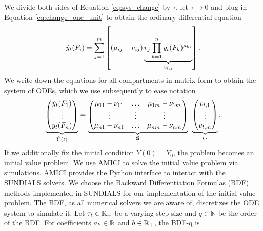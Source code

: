 We divide both sides of Equation \eqref{eq:sys_change} by $\tau$, let $\tau \to 0$ and plug in Equation \eqref{eq:change_one_unit} to obtain the ordinary differential equation
\begin{align}
\dot{y}_t(F_i) = \sum_{j=1}^m \left[(\mu_{ij} - \nu_{ij}) \underbrace{r_j  \prod_{k=1}^n y_t(F_k)^{\mu_{kj}}}_{v_{t,j}} \right].
\end{align}
We write down the equations for all compartments in matrix form to obtain the system of ODEs, which we use subsequently to ease notation
\begin{align}
\label{eq:ode_system_matrix}
\underbrace{\begin{pmatrix}
\dot{y}_t(F_1) \\ \vdots \\ \dot{y}_t(F_n) \end{pmatrix}}_{\dot{Y}(t)} =
\underbrace{\begin{pmatrix}
\mu_{11} - \nu_{11} & \hdots & \mu_{1m} - \nu_{1m} \\
\vdots & \vdots & \vdots \\
\mu_{n1} - \nu_{n1} & \hdots & \mu_{nm} - \nu_{nm} \\
\end{pmatrix}}_{\mathbf{S}} \cdot
\underbrace{\begin{pmatrix}
v_{t,1} \\ \vdots \\ v_{t,m}
\end{pmatrix}}_{v_t}.
\end{align}
If we additionally fix the initial condition $Y(0) = Y_0$, the problem becomes an initial value problem. 
We use AMICI \citep{Frohlich.2021} to solve the initial value problem via simulations. AMICI provides the Python interface to interact with the SUNDIALS \citep{Hindmarsh.2005} solvers. We choose the Backward Differentiation Formulas (BDF) methods implemented in SUNDIALS for our implementation  of the initial value problem. The BDF, as all numerical solvers we are aware of, discretizes the ODE system to simulate it. Let $\tau_t \in \mathbb{R}_+$ be a varying step size and $q \in \mathbb{N}$ be the order of the BDF. For coefficients $a_k\in \mathbb{R}$ and $b \in \mathbb{R}_+$, the BDF-q is  
